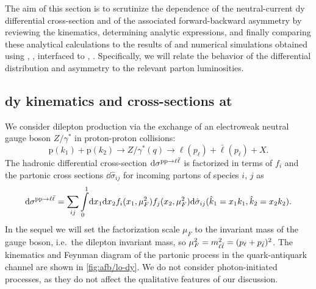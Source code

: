 
The aim of this  section is to scrutinize the \pdf dependence of the
neutral-current \acrlong{dy} differential cross-section and of the associated
forward-backward asymmetry by reviewing the \lo kinematics, determining \lo
analytic expressions, and finally comparing these analytical calculations to
the results of \lo and \nlo  numerical simulations obtained using \mgamc,
\cite{Alwall:2014hca}, interfaced to \pineappl,
\cite{Carrazza:2020gss,christopher_schwan_2022_7023438}.
%
Specifically, we will relate the behavior of the differential distribution and
asymmetry to the relevant parton luminosities.

\subsection{\acrlong{dy} kinematics and cross-sections at \lo}
\label{sec:afb/dylo}

We consider dilepton production via the exchange of an electroweak neutral
gauge boson $Z/\gamma^*$ in proton-proton collisions:
\begin{equation}
  \label{eq:afb/DYprocess}
  \mathrm{p}(k_1) + \mathrm{p}(k_2) \to Z/\gamma^*(q) \to \ell(p_{\ell}) + \bar{\ell}(p_{\bar{\ell}}) + X \text{.}
\end{equation}
The hadronic differential cross-section $\dd\sigma^{\mathrm{p}\mathrm{p}\to\ell\bar{\ell}}$  is factorized in
terms of \pdfs $f_i$ and the partonic cross sections
$\dd\hat\sigma_{ij}$ for incoming partons of species $i,\,j$ as
\begin{equation}
  \dd\sigma^{\mathrm{p}\mathrm{p}\to\ell\bar{\ell}} = \sum_{ij} \int\limits_0^1\!\dd x_1 \dd
  x_2 f_i(x_1,\mu_F^2) f_j(x_2,\mu_F^2) \dd\hat\sigma_{ij}(\hat k_1 = x_1
  k_1, \hat k_2 = x_2 k_2).
  \label{eq:afb/factorization}
\end{equation}
In the sequel we will set the  factorization scale $\mu_F$ to the
invariant mass of the gauge boson, i.e.\ the dilepton
invariant mass, so $\mu^2_F = m_{\ell\bar{\ell}}^2=(p_\ell + p_{\bar{\ell}})^2$.
%
The kinematics and Feynman diagram of the \lo partonic process
in the quark-antiquark channel are shown in \cref{fig:afb/lo-dy}.
We do not consider photon-initiated processes, as they do not affect
the qualitative features of our discussion.



